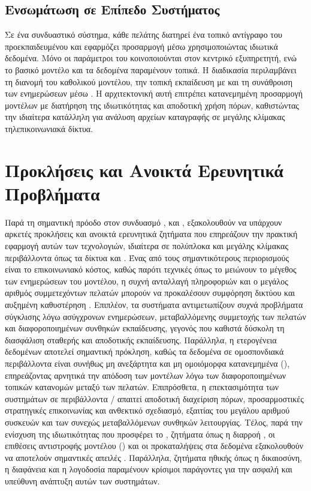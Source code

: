 \subsection{Ενσωμάτωση σε Επίπεδο Συστήματος}

Σε ένα συνδυαστικό σύστημα, κάθε πελάτης διατηρεί ένα τοπικό αντίγραφο του προεκπαιδευμένου  και εφαρμόζει προσαρμογή μέσω  χρησιμοποιώντας ιδιωτικά δεδομένα. Μόνο οι παράμετροι του  κοινοποιούνται στον κεντρικό εξυπηρετητή, ενώ το βασικό μοντέλο και τα δεδομένα παραμένουν τοπικά. Η διαδικασία περιλαμβάνει τη διανομή του καθολικού μοντέλου, την τοπική εκπαίδευση με  και τη συνάθροιση των ενημερώσεων μέσω . Η αρχιτεκτονική αυτή επιτρέπει κατανεμημένη προσαρμογή μοντέλων με διατήρηση της ιδιωτικότητας και αποδοτική χρήση πόρων, καθιστώντας την ιδιαίτερα κατάλληλη για ανάλυση αρχείων καταγραφής σε μεγάλης κλίμακας τηλεπικοινωνιακά δίκτυα.

\section{Προκλήσεις και Ανοικτά Ερευνητικά Προβλήματα}

Παρά τη σημαντική πρόοδο στον συνδυασμό ,  και , εξακολουθούν να υπάρχουν αρκετές προκλήσεις και ανοικτά ερευνητικά ζητήματα που επηρεάζουν την πρακτική εφαρμογή αυτών των τεχνολογιών, ιδιαίτερα σε πολύπλοκα και μεγάλης κλίμακας περιβάλλοντα όπως τα δίκτυα  και . Ένας από τους σημαντικότερους περιορισμούς είναι το επικοινωνιακό κόστος, καθώς παρότι τεχνικές όπως το  μειώνουν το μέγεθος των ενημερώσεων του μοντέλου, η συχνή ανταλλαγή πληροφοριών και ο μεγάλος αριθμός συμμετεχόντων πελατών μπορούν να προκαλέσουν συμφόρηση δικτύου και αυξημένη καθυστέρηση \cite{kairouz2021advances}. Επιπλέον, τα συστήματα  αντιμετωπίζουν συχνά προβλήματα σύγκλισης λόγω ασύγχρονων ενημερώσεων, μεταβαλλόμενης συμμετοχής των πελατών και διαφοροποιημένων συνθηκών εκπαίδευσης, γεγονός που καθιστά δύσκολη τη διασφάλιση σταθερής και αποδοτικής εκπαίδευσης. Παράλληλα, η ετερογένεια δεδομένων αποτελεί σημαντική πρόκληση, καθώς τα δεδομένα σε ομοσπονδιακά περιβάλλοντα είναι συνήθως μη ανεξάρτητα και μη ομοιόμορφα κατανεμημένα (), επηρεάζοντας αρνητικά την απόδοση των μοντέλων λόγω των διαφοροποιημένων τοπικών κατανομών μεταξύ των πελατών. Επιπρόσθετα, η επεκτασιμότητα των συστημάτων σε περιβάλλοντα / απαιτεί αποδοτική διαχείριση πόρων, προσαρμοστικές στρατηγικές επικοινωνίας και ανθεκτικό σχεδιασμό, εξαιτίας του μεγάλου αριθμού συσκευών και των συνεχώς μεταβαλλόμενων συνθηκών λειτουργίας. Τέλος, παρά την ενίσχυση της ιδιωτικότητας που προσφέρει το , ζητήματα όπως η διαρροή , οι επιθέσεις αντιστροφής μοντέλου () και οι προκαταλήψεις στα δεδομένα εξακολουθούν να αποτελούν σημαντικές απειλές \cite{zhu2019deep}. Παράλληλα, ζητήματα ηθικής όπως η δικαιοσύνη, η διαφάνεια και η λογοδοσία παραμένουν κρίσιμοι παράγοντες για την ασφαλή και υπεύθυνη ανάπτυξη αυτών των συστημάτων.

